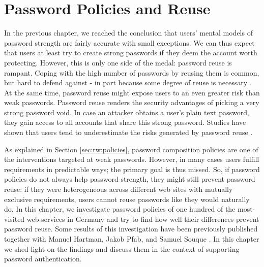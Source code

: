\chapter[Password Policies and Reuse]{Password Policies and Reuse}\label{chap:policies_reuse}
In the previous chapter, we reached the conclusion that users' mental models of password strength are fairly accurate with small exceptions. We can thus expect that users at least try to create strong passwords if they deem the account worth protecting. 
However, this is only one side of the medal: password reuse is rampant. Coping with the high number of passwords by reusing them is common, but hard to defend against - in part because some degree of reuse is necessary \cite{Florencio2014PasswordPortfoliosFiniteUser, ZhangKennedy2016RevisitingPasswordRules}.  At the same time, password reuse might expose users to an even greater risk than weak passwords. Password reuse renders the security advantages of picking a very strong password void. In case an attacker obtains a user's plain text password, they gain access to all accounts that share this strong password. Studies have shown that users tend to underestimate the risks generated by password reuse \ar.

As explained in Section \ref{sec:rw:policies}, password composition policies are one of the interventions targeted at weak passwords. However, in many cases users fulfill requirements in predictable ways; the primary goal is thus missed. So, if password policies do not always help password strength, they might still prevent password reuse: if they were heterogeneous across different web sites with mutually exclusive requirements, users cannot reuse passwords like they would naturally do. In this chapter, we investigate password policies of one hundred of the most-visited web-services in Germany and try to find how well their differences prevent password reuse. Some results of this investigation have been previously published together with Manuel Hartman, Jakob Pfab, and Samuel Souque \cite{Seitz2017PoliciesReuse}. In this chapter we shed light on the findings and discuss them in the context of supporting password authentication. 

